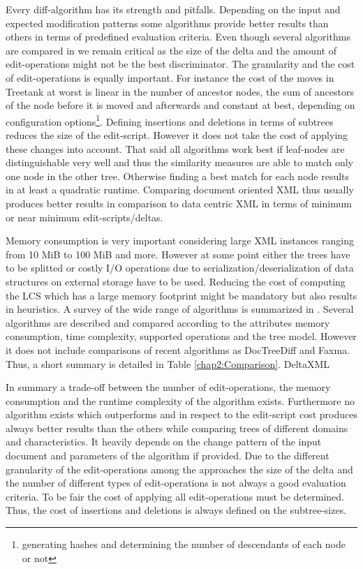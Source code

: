 Every diff-algorithm has its strength and pitfalls. Depending on the input and expected modification patterns some algorithms provide better results than others in terms of predefined evaluation criteria. Even though several algorithms are compared in \cite{ronnau2009efficient} we remain critical as the size of the delta and the amount of edit-operations might not be the best discriminator. The granularity and the cost of edit-operations is equally important. For instance the cost of the moves in Treetank at worst is linear in the number of ancestor nodes, the sum of ancestors of the node before it is moved and afterwards and constant at best, depending on configuration options\footnote{generating hashes and determining the number of descendants of each node or not}. Defining insertions and deletions in terms of subtrees reduces the size of the edit-script. However it does not take the cost of applying these changes into account. That said all algorithms work best if leaf-nodes are distinguishable very well and thus the similarity measures are able to match only one node in the other tree. Otherwise finding a best match for each node results in at least a quadratic runtime. Comparing document oriented XML thus usually produces better results in comparison to data centric XML in terms of minimum or near minimum edit-scripts/deltas.

Memory consumption is very important considering large XML instances ranging from 10 MiB to 100 MiB and more. However at some point either the trees have to be splitted or costly I/O operations due to serialization/deserialization of data structures on external storage have to be used. Reducing the cost of computing the LCS which has a large memory footprint might be mandatory but also results in heuristics. A survey of the wide range of algorithms is summarized in \cite{cobena2002comparative}. Several algorithms are described and compared according to the attributes memory consumption, time complexity, supported operations and the tree model. However it does not include comparisons of recent algorithms as DocTreeDiff and Faxma. Thus, a short summary is detailed in Table \ref{chap2:Comparison}. DeltaXML 

In summary a trade-off between the number of edit-operations, the memory consumption and the runtime complexity of the algorithm exists. Furthermore no algorithm exists which outperforms and in respect to the edit-script cost produces always better results than the others while comparing trees of different domains and characteristics. It heavily depends on the change pattern of the input document and parameters of the algorithm if provided. Due to the different granularity of the edit-operations among the approaches the size of the delta and the number of different types of edit-operations is not always a good evaluation criteria. To be fair the cost of applying all edit-operations must be determined. Thus, the cost of insertions and deletions is always defined on the subtree-sizes.

